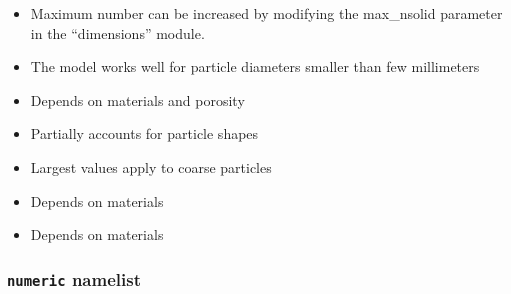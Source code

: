 \begin{itemize}

\item
{}
{Maximum number can be increased by modifying the max\_nsolid parameter
in the ``dimensions'' module.}

\item
{}
{The model works well for particle diameters smaller than few millimeters}

\item
{}
{Depends on materials and porosity}

\item
{}
{Partially accounts for particle shapes}

\item
{}
{Largest values apply to coarse particles}

\item
{}
{Depends on materials}

\item
{}
{Depends on materials}

\end{itemize}

\subsubsection{{\tt numeric} namelist}

